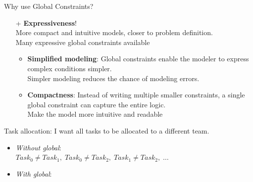 \documentclass{cons-beamer}
\begin{document}
\begin{frame}{Why use Global Constraints?}
  \begin{itemize}
    \item[+] \textbf{Expressiveness}! \\
      More compact and intuitive models, closer to problem definition. \\ 
      Many expressive global constraints available \vfill 
      \begin{itemize}
        \item \textbf{Simplified modeling}: Global constraints enable the modeler to express complex conditions simpler. \\
              Simpler modeling reduces the chance of modeling errors.

        \item \textbf{Compactness}: Instead of writing multiple smaller constraints, a single global constraint can capture the entire logic. \\
Make the model more intuitive and readable
      \end{itemize}
  \end{itemize}
  \vfill

  \begin{example}
    Task allocation: I want all tasks to be allocated to a different team. \\
    \begin{itemize}
      \item \textit{Without global}: \\
            $Task_0 \neq Task_1, \; Task_0 \neq Task_2, \; Task_1 \neq Task_2, \; \dots$
      \item \textit{With global}: 
    \end{itemize}
  \end{example}
\end{frame}
\end{document}
